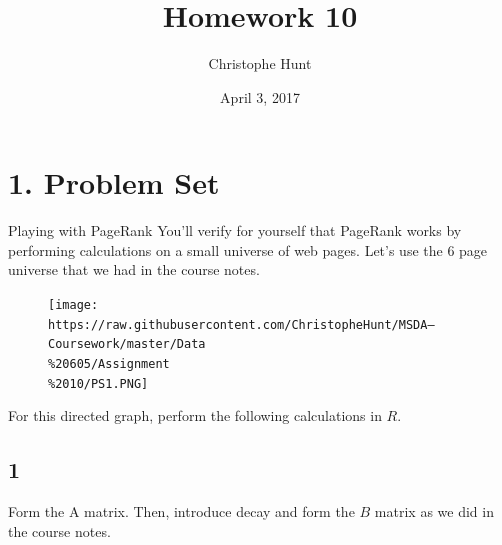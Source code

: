 \documentclass[]{article}
\title{Homework 10}
\author{Christophe Hunt}
\date{April 3, 2017}
\begin{document}
\maketitle

{
\setcounter{tocdepth}{2}
\tableofcontents
}
\section{1. Problem Set}\label{problem-set}

Playing with PageRank You'll verify for yourself that PageRank works by
performing calculations on a small universe of web pages. Let's use the
6 page universe that we had in the course notes.

\begin{figure}[htbp]
\centering
\texttt{[image: https://raw.githubusercontent.com/ChristopheHunt/MSDA---Coursework/master/Data\\\%20605/Assignment\\\%2010/PS1.PNG]}
\caption{}
\end{figure}

For this directed graph, perform the following calculations in \(R\).

\subsection{1}\label{section}

Form the A matrix. Then, introduce decay and form the \(B\) matrix as we
did in the course notes.
\end{document}
